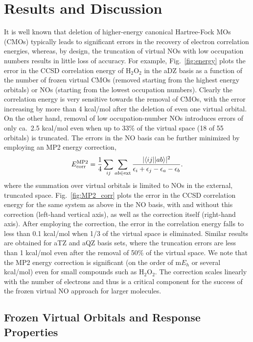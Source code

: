 \section{Results and Discussion}

It is well known that deletion of higher-energy canonical Hartree-Fock MOs
(CMOs) typically leads to significant errors in the recovery of electron
correlation energies, whereas, by design, the truncation of virtual NOs with
low occupation numbers results in little loss of accuracy.\cite{Landau10,Taube05,Taube08}
For example, Fig.~\ref{fig:energy} plots the error in
the CCSD correlation energy of H$_2$O$_2$ in the aDZ basis as a function of
the number of frozen virtual CMOs (removed starting from the highest energy
orbitals) or NOs (starting from the lowest occupation numbers).  Clearly the
correlation energy is very sensitive towards the removal of CMOs, with the
error increasing by more than 4 kcal/mol after the deletion of even one
virtual orbital.  On the other hand, removal of low occupation-number NOs
introduces errors of only ca.\ 2.5 kcal/mol even when up to 33\% of the
virtual space (18 of 55 orbitals) is truncated.  The errors in
the NO basis can be further minimized by employing an MP2 energy correction,
\begin{equation}
E^{\rm MP2}_{\rm corr} = \frac{1}{4} \sum_{ij} \sum_{ab \in {\rm ext}} \frac{|\langle
ij||ab\rangle|^2}{\epsilon_i + \epsilon_j - \epsilon_a - \epsilon_b}.
\label{Eq:MP2}
\end{equation}
where the summation over virtual orbitals is limited to NOs in the external,
truncated space.  Fig.~\ref{fig:MP2_corr} plots the error in the CCSD
correlation energy for the same system as above in the NO basis, with and
without this correction (left-hand vertical axis), as well as the correction
itself (right-hand axis).  After employing the correction, the error in the
correlation energy falls to less than 0.1 kcal/mol when 1/3 of the virtual
space is eliminated. Similar results are obtained for aTZ and aQZ basis sets,
where the truncation errors are less than 1 kcal/mol even after the removal of 50\%
of the virtual space. We note that the MP2 energy correction is significant 
(on the order of m$E_h$ or several kcal/mol) even for small compounds such as 
H$_2$O$_2$.  The correction scales linearly with the number of electrons and 
thus is a critical component for the success of the frozen virtual NO approach 
for larger molecules.

\subsection{Frozen Virtual Orbitals and Response Properties}

